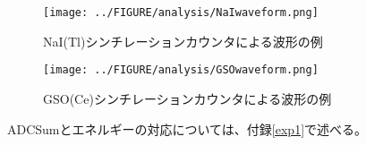 \documentclass[../../main.tex]{subfiles}
\numberwithin{equation}{section}
\numberwithin{table}{section}
\numberwithin{figure}{section}
\begin{document}


\begin{figure}[H]
  \begin{minipage}{0.5\hsize}
    \centering
    \texttt{[image: ../FIGURE/analysis/NaIwaveform.png]}
    \caption{NaI(Tl)シンチレーションカウンタによる波形の例}
    \label{fig:NaIwaveform}
  \end{minipage}
  \begin{minipage}{0.5\hsize}
    \centering
    \texttt{[image: ../FIGURE/analysis/GSOwaveform.png]}
    \caption{GSO(Ce)シンチレーションカウンタによる波形の例}
    \label{fig:GSOwaveform}
  \end{minipage}
\end{figure}

ADCSumとエネルギーの対応については、付録\ref{exp1}で述べる。
\end{document}
